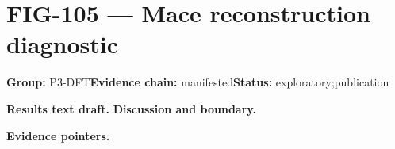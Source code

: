 \clearpage
\section{FIG-105 --- Mace reconstruction diagnostic}
\label{figpage:fig-105}
\textbf{Group:} P3-DFT\quad \textbf{Evidence chain:} manifested\quad \textbf{Status:} exploratory;publication

\textbf{Results text draft.} 
\textbf{Discussion and boundary.} 


\textbf{Evidence pointers.}



\vfill

